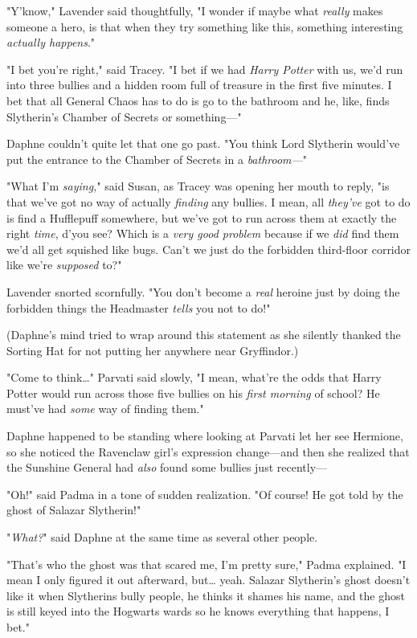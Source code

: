 "Y'know," Lavender said thoughtfully, "I wonder if maybe what \emph{really} 
makes someone a hero, is that when they try something like this, something 
interesting \emph{actually happens}."

"I bet you're right," said Tracey. "I bet if we had \emph{Harry Potter} with 
us, we'd run into three bullies and a hidden room full of treasure in the first 
five minutes. I bet that all General Chaos has to do is go to the bathroom and 
he, like, finds Slytherin's Chamber of Secrets or something---"

Daphne couldn't quite let that one go past. "You think Lord Slytherin would've 
put the entrance to the Chamber of Secrets in a \emph{bathroom---}"

"What I'm \emph{saying,}" said Susan, as Tracey was opening her mouth to reply, 
"is that we've got no way of actually \emph{finding} any bullies. I mean, all 
\emph{they've} got to do is find a Hufflepuff somewhere, but we've got to run 
across them at exactly the right \emph{time}, d'you see? Which is a \emph{very 
good problem} because if we \emph{did} find them we'd all get squished like 
bugs. Can't we just do the forbidden third-floor corridor like we're 
\emph{supposed} to?"

Lavender snorted scornfully. "You don't become a \emph{real} heroine just by 
doing the forbidden things the Headmaster \emph{tells} you not to do!"

(Daphne's mind tried to wrap around this statement as she silently thanked the 
Sorting Hat for not putting her anywhere near Gryffindor.)

"Come to think{\ldots}" Parvati said slowly, "I mean, what're the odds that 
Harry Potter would run across those five bullies on his \emph{first morning} of 
school? He must've had \emph{some} way of finding them."

Daphne happened to be standing where looking at Parvati let her see Hermione, 
so she noticed the Ravenclaw girl's expression change---and then she realized 
that the Sunshine General had \emph{also} found some bullies just recently---

"Oh!" said Padma in a tone of sudden realization. "Of course! He got told by 
the ghost of Salazar Slytherin!"

"\emph{What?}" said Daphne at the same time as several other people.

"That's who the ghost was that scared me, I'm pretty sure," Padma explained. "I 
mean I only figured it out afterward, but{\ldots} yeah. Salazar Slytherin's 
ghost doesn't like it when Slytherins bully people, he thinks it shames his 
name, and the ghost is still keyed into the Hogwarts wards so he knows 
everything that happens, I bet."

